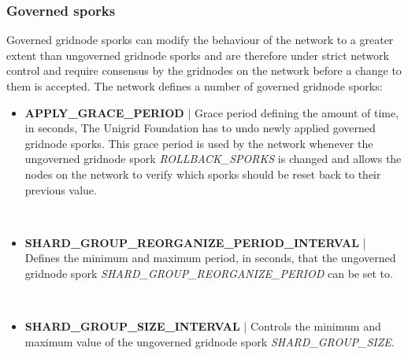 \documentclass[10pt,a4paper,final]{article}
\newcommand{\colorbitbox}[3]{%
  \rlap{\bitbox{#2}{\color{#1}\rule{\width}{\height}}}%
  \bitbox{#2}{#3}
}
\begin{document}
\subsubsection{Governed sporks}
Governed \gls{gridnode} sporks can modify the behaviour of the network to a greater extent than ungoverned \gls{gridnode} sporks and are therefore under strict network control and require consensus by the \glspl{gridnode} on the network before a change to them is accepted. The network defines a number of governed \gls{gridnode} sporks:

\begin{itemize}
\item \textbf{APPLY\_GRACE\_PERIOD} | Grace period defining the amount of time, in seconds, The Unigrid Foundation has to undo newly applied governed \gls{gridnode} sporks. This grace period is used by the network whenever the ungoverned \gls{gridnode} spork \emph{ROLLBACK\_SPORKS} is changed and allows the nodes on the network to verify which sporks should be reset back to their previous value.

\medskip
\begin{bytefield}[bitwidth=0.5em]{64}
	 \\
	\colorbitbox{lightgray}{32}{reserved}
\end{bytefield}

\item \textbf{SHARD\_GROUP\_REORGANIZE\_PERIOD\_INTERVAL} | Defines the minimum and maximum period, in seconds, that the ungoverned \gls{gridnode} spork \emph{SHARD\_GROUP\_REORGANIZE\_PERIOD} can be set to.

\medskip
\begin{bytefield}[bitwidth=0.5em]{64}
	 \\
\end{bytefield}

\item \textbf{SHARD\_GROUP\_SIZE\_INTERVAL} | Controls the minimum and maximum value of the ungoverned \gls{gridnode} spork \emph{SHARD\_GROUP\_SIZE}.

\medskip
\begin{bytefield}[bitwidth=0.5em]{64}
	 \\
	\colorbitbox{lightgray}{32}{reserved}
\end{bytefield}
 
\end{itemize}
\end{document}
